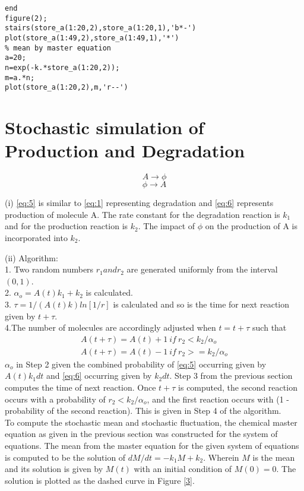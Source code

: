 \documentclass[10 pt]{article}
\begin{document}
\begin{multicols}{2}
\begin{flushleft}
\begin{lstlisting}
end
figure(2);
stairs(store_a(1:20,2),store_a(1:20,1),'b*-')
plot(store_a(1:49,2),store_a(1:49,1),'*')
% mean by master equation
a=20;
n=exp(-k.*store_a(1:20,2));
m=a.*n;
plot(store_a(1:20,2),m,'r--')
\end{lstlisting}
\end{flushleft}

\section{Stochastic simulation of Production and Degradation}
\begin{equation}\label{eq:5}
A\rightarrow \phi
\end{equation}
\begin{equation} \label{eq:6}
\phi \rightarrow A
\end{equation}
\begin{flushleft}
(i)
\ref{eq:5} is similar to \ref{eq:1} representing degradation and \ref{eq:6} represents production of molecule A. The rate constant for the degradation reaction is $k_1$ and for the production reaction is $k_2$. The impact of $\phi$ on the production of A is incorporated into $k_2$.
\end{flushleft}
\begin{flushleft}
(ii)
Algorithm:\\
1. Two random numbers $r_1 and r_2$ are generated uniformly from the interval $(0,1)$.\\
2. $\alpha_o = A(t)k_1 + k_2$ is calculated.\\
3. $ \tau=1/(A(t)k)ln[1/r]$ is calculated and so is the time for next reaction given by $t+\tau$.\\
4.The number of molecules are accordingly adjusted when $t=t+\tau$ such that
\begin{align}
A(t+\tau) = A(t) + 1 \: if\:  r_2 < k_2/\alpha_o \\
A(t+\tau) = A(t) - 1 \: if \: r_2 >= k_2/\alpha_o
\end{align}
$\alpha_o$ in Step 2 given the combined probability of \ref{eq:5} occurring given by $A(t)k_1 dt$ and \ref{eq:6} occurring given by $k_2 dt$. Step 3 from the previous section computes the time of next reaction. Once $t+\tau$ is computed, the second reaction occurs with a probability of $r_2 < k_2/\alpha_o$, and the first reaction occurs with (1 - probability of the second reaction). This is given in Step 4 of the algorithm.\\
To compute the stochastic mean and stochastic fluctuation, the chemical master equation as given in the previous section was constructed for the system of equations. The mean from the master equation for the given system of equations is computed to be the solution of $dM/dt=-k_1M + k_2$. Wherein $M$ is the mean and its solution is given by $M(t)$ with an initial condition of $M(0)=0$. The solution is plotted as the dashed curve in Figure \ref{3}.\\

\end{flushleft}
\end{multicols}
\end{document}
